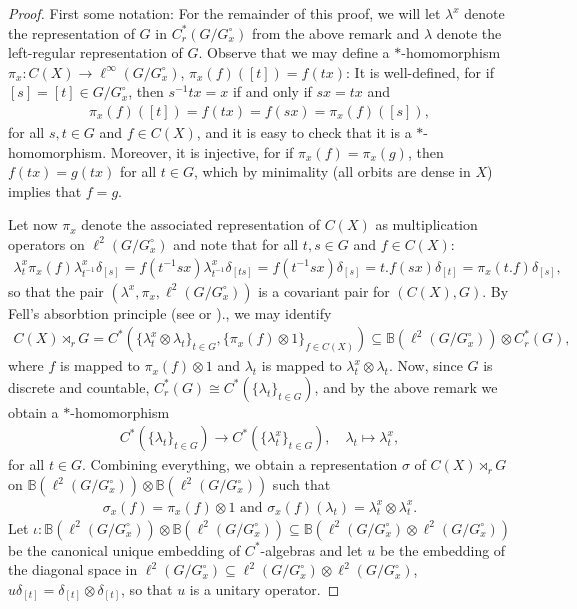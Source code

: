 \begin{proof}
	First some notation: For the remainder of this proof, we will let $\lambda^x$ denote the representation of $G$ in $C_r^*(G/G_x^\circ)$ from the above remark and $\lambda$ denote the left-regular representation of $G$. Observe that we may define a $*$-homomorphism $\pi_x \colon C(X) \to \ell^\infty(G/G_x^\circ)$, $\pi_x(f)([t])=f(tx)$: It is well-defined, for if $[s]=[t] \in G/G_x^\circ$, then $s^{-1}tx = x$ if and only if $sx=tx$ and 
	\begin{align*}
		\pi_x(f)([t])=f(tx) = f(sx) = \pi_x(f)([s]),
	\end{align*}
	for all $s,t \in G$ and $f \in C(X)$, and it is easy to check that it is a $*$-homomorphism. Moreover, it is injective, for if $\pi_x(f) = \pi_x(g)$, then $f(tx)=g(tx)$ for all $t \in G$, which by minimality (all orbits are dense in $X$) implies that $f=g$.
	
	Let now $\pi_x$ denote the associated representation of $C(X)$ as multiplication operators on $\ell^2(G/G_x^\circ)$ and note that for all $t,s \in G$ and $f \in C(X)$:
	\begin{align*}
		\lambda^x_t \pi_x (f) \lambda^x_{t^{-1}} \delta_{[s]} = f(t^{-1}sx)\lambda^x_{t^{-1}} \delta_{[ts]} = f(t^{-1}sx) \delta_{[s]} = t.f(sx) \delta_{[t]} = \pi_x(t.f) \delta_{[s]},
	\end{align*}
	so that the pair $(\lambda^x, \pi_x, \ell^2(G/G_x^\circ))$ is a covariant pair for $(C(X),G)$. By Fell's absorbtion principle (see \cite[Proposition 4.1.7]{brown2008c} or \cite[25]{approxtalk})., we may identify
	\begin{align*}
		C(X) \rtimes_r G =C^*\left(\{\lambda^x_t \otimes  \lambda_t \}_{t \in G} , \{\pi_x(f) \otimes 1 \}_{f \in C(X)}\right) \subseteq \mathbb{B}(\ell^2(G/G_x^\circ)) \otimes C_r^*(G),
	\end{align*}
	where $f$ is mapped to $\pi_x(f) \otimes 1$ and $\lambda_t$ is mapped to $\lambda^x_t \otimes \lambda_t$. Now, since $G$ is discrete and countable, $C_r^*(G) \cong C^*(\{\lambda_t\}_{t \in G})$, and by the above remark we obtain a $*$-homomorphism 
\begin{align*}
	 C^*(\{\lambda_t\}_{t \in G}) \to C^*(\{\lambda_t^x\}_{t \in G}), \quad \lambda_t\mapsto  \lambda_t^x,
\end{align*}
for all $t \in G$. Combining everything, we obtain a representation $\sigma$ of $C(X) \rtimes_r G$ on $\mathbb{B}(\ell^2(G/G_x^\circ)) \otimes \mathbb{B}(\ell^2(G/G_x^\circ))$ such that
\begin{align*}
	\sigma_x(f) = \pi_x(f) \otimes 1 \text{  and  } \sigma_x(f)(\lambda_t)=\lambda_t^x \otimes \lambda_t^x.	
\end{align*}
Let $\iota \colon \mathbb{B}(\ell^2(G/G_x^\circ)) \otimes \mathbb{B}(\ell^2(G/G_x^\circ)) \subseteq  \mathbb{B}(\ell^2(G/G_x^\circ) \otimes \ell^2(G/G_x^\circ))$ be the canonical unique embedding of $C^*$-algebras and let $u$ be the embedding of the diagonal space in $\ell^2(G/G_x^\circ)  \subseteq \ell^2(G/G_x^\circ) \otimes \ell^2(G/G_x^\circ)$, $u \delta_{[t]} = \delta_{[t]} \otimes \delta_{[t]}$, so that $u$ is a unitary operator.


\end{proof}
